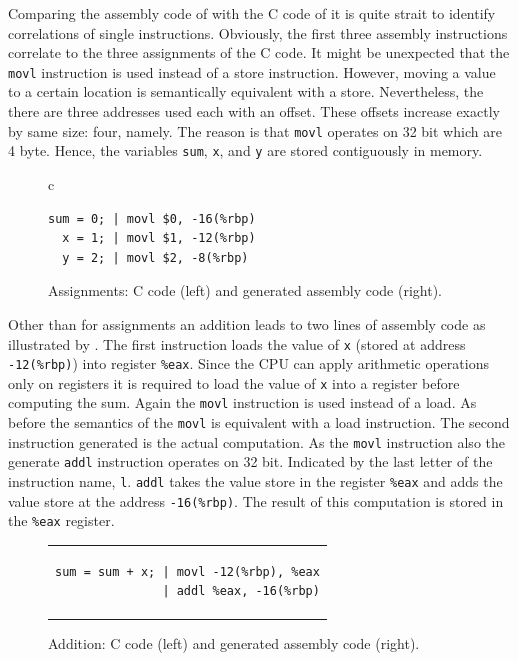 \documentclass[onecolumn, openright, master, english, signatures]{dbrgrptt}
\begin{document}
Comparing the assembly code of  with the C code of  it is quite strait to identify correlations of single instructions. Obviously, the first three assembly instructions correlate to the three assignments of the C code. It might be unexpected that the \texttt{movl} instruction is used instead of a store instruction. However, moving a value to a certain location is semantically equivalent with a store. Nevertheless, the there are three addresses used each with an offset. These offsets increase exactly by same size: four, namely. The reason is that \texttt{movl} operates on 32 bit which are 4 byte. Hence, the variables \texttt{sum}, \texttt{x}, and \texttt{y} are stored contiguously in memory.

\begin{figure}[!ht]
  \centering
  \begin{tabular}{c}
  \begin{lstlisting}
sum = 0; | movl $0, -16(%rbp)
  x = 1; | movl $1, -12(%rbp)
  y = 2; | movl $2, -8(%rbp)
  \end{lstlisting}
  \end{tabular}
  \caption{Assignments: C code (left) and generated assembly code (right).}
  \label{fig:mat-example-comp-assignment}
\end{figure}

Other than for assignments an addition leads to two lines of assembly code as illustrated by . The first instruction loads the value of \texttt{x} (stored at address \texttt{-12(\%rbp)}) into register \texttt{\%eax}. Since the \ac{CPU} can apply arithmetic operations only on registers it is required to load the value of \texttt{x} into a register before computing the sum. Again the \texttt{movl} instruction is used instead of a load. As before the semantics of the \texttt{movl} is equivalent with a load instruction. The second instruction generated is the actual computation. As the \texttt{movl} instruction also the generate \texttt{addl} instruction operates on 32 bit. Indicated by the last letter of the instruction name, \texttt{l}. \texttt{addl} takes the value store in the register \texttt{\%eax} and adds the value store at the address \texttt{-16(\%rbp)}. The result of this computation is stored in the \texttt{\%eax} register.

\begin{figure}[!ht]
  \centering
  \begin{tabular}{c}
  \begin{lstlisting}
sum = sum + x; | movl -12(%rbp), %eax
               | addl %eax, -16(%rbp)
  \end{lstlisting}
  \end{tabular}
  \caption{Addition: C code (left) and generated assembly code (right).}
  \label{fig:mat-example-comp-addition}
\end{figure}
\end{document}
